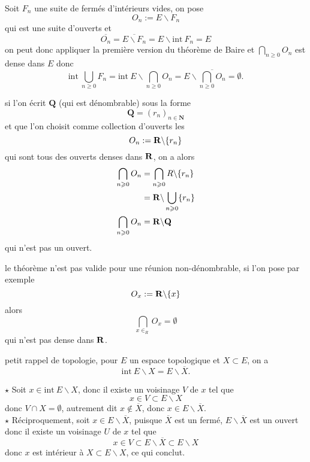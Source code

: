 \documentclass[a4paper,11pt, twoside]{article}
\begin{document}
\begin{Proof}
  Soit $F_n$ une suite de fermés d'intérieurs vides, on pose 
  $$O_n:=E\backslash F_n$$
  qui est une suite d'ouverts et 
  $$\overline{O_n}=\overline{E\backslash F_n}=E\backslash \mathrm{int}\ {F_n}=E$$
  on peut donc appliquer la première version du théorème de Baire et $\bigcap_{n\geqslant 0}O_n$ est dense dans $E$ donc
  $$\mathrm{int}\ \bigcup_{n\geqslant 0}F_n=\mathrm{int}\ E\backslash \bigcap_{n\geqslant 0}O_n=E\backslash \overline{\bigcap_{n\geqslant 0}O_n}=\emptyset.$$
\end{Proof}



\begin{RQ}
  si l'on écrit $\mathbf Q$ (qui est dénombrable) sous la forme 
  $$\mathbf Q=\left(r_n\right)_{n\in\mathbf N}$$
  et que l'on choisit comme collection d'ouverts les 
  $$O_n:=\mathbf R\backslash \{r_n\}$$
  qui sont tous des ouverts denses dans $\mathbf R$, on a alors
  \begin{align*}
    \bigcap_{n\geqslant 0}O_n&=\bigcap_{n\geqslant 0}R\backslash \{r_n\}\\
    &=\mathbf R\backslash \bigcup_{n\geqslant 0}\{r_n\}\\
    \bigcap_{n\geqslant 0}O_n&=\mathbf R\backslash \mathbf Q
  \end{align*}
  qui n'est pas un ouvert.
\end{RQ}


\begin{RQ} 
  le théorème n'est pas valide pour une réunion non-dénombrable, si l'on pose par exemple
  $$O_x:=\mathbf R\backslash \{x\}$$
  alors 
  $$\bigcap_{x\in_R}O_x=\emptyset$$
  qui n'est pas dense dans $\mathbf R$.
\end{RQ}

\begin{RQ}
  petit rappel de topologie, pour $E$ un espace topologique et $X\subset E$, on a 
  $$\mathrm{int}\ E\backslash X = E\backslash \overline{X}.$$
\end{RQ}


\begin{Proof}
  $\star$ Soit $x\in\mathrm{int}\ E\backslash X$, donc il existe un voisinage $V$ de $x$ tel que 
  $$x\in V\subset E\backslash X$$
  donc $V\cap X=\emptyset$, autrement dit $x\notin \overline X$, donc $x\in E\backslash \overline{X}$.\\

  $\star$ Réciproquement, soit $x\in E\backslash \overline{X}$, puisque $\overline X$ est un fermé, $E\backslash\overline X$ est un ouvert donc il existe un voisinage $U$ de $x$ tel que 
  $$x\in V\subset E\backslash\overline X\subset E\backslash X$$
  donc $x$ est intérieur à $X\subset E\backslash X$, ce qui conclut.
\end{Proof}
\end{document}
